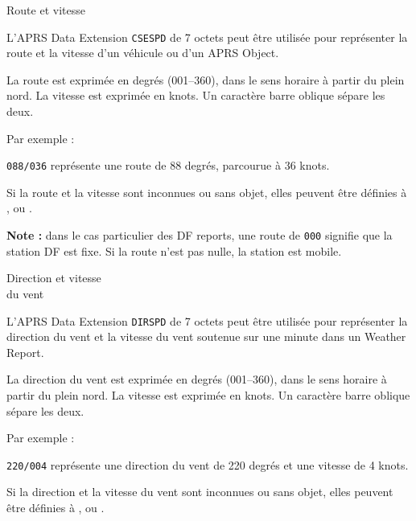 \begin{aprssideblock}{Route et vitesse}
\label{course-and-speed}
L'APRS Data Extension \texttt{CSE}\lit{/}\texttt{SPD} de 7 octets peut être utilisée
pour représenter la route et la vitesse d'un véhicule ou d'un APRS
Object.

La route est exprimée en degrés (001--360), dans le sens horaire à
partir du plein nord. La vitesse est exprimée en knots. Un caractère
barre oblique \lit{/} sépare les deux.

Par exemple :

\begin{aprsexample}
\texttt{088/036} \exgap représente une route de 88 degrés, parcourue à
36 knots.
\end{aprsexample}

Si la route et la vitesse sont inconnues ou sans objet, elles peuvent
être définies à ,  ou
\chsevenblanktripletslash.

\textbf{Note :} dans le cas particulier des DF reports, une route de
\texttt{000} signifie que la station DF est fixe. Si la route n'est pas
nulle, la station est mobile.
\end{aprssideblock}

\begin{aprssideblock}{Direction et vitesse\\du vent}
\label{wind-direction-and-wind-speed}
L'APRS Data Extension \texttt{DIR}\lit{/}\texttt{SPD} de 7 octets peut être utilisée
pour représenter la direction du vent et la vitesse du vent soutenue
sur une minute dans un Weather Report.

La direction du vent est exprimée en degrés (001--360), dans le sens
horaire à partir du plein nord. La vitesse est exprimée en knots. Un
caractère barre oblique \lit{/} sépare les deux.

Par exemple :

\begin{aprsexample}
\texttt{220/004} \exgap représente une direction du vent de 220 degrés
et une vitesse de 4 knots.
\end{aprsexample}

Si la direction et la vitesse du vent sont inconnues ou sans objet,
elles peuvent être définies à ,  ou
\chsevenblanktripletslash.
\end{aprssideblock}

